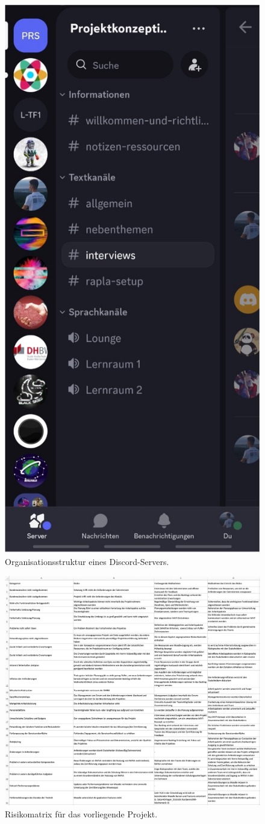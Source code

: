 \begin{figure}[H]
  \centering
  \includegraphics[width=0.47\linewidth]{graphics/discord.jpg}
  \caption{Organisationsstruktur eines Discord-Servers.}\label{abb:discord}
\end{figure}
\label{anhang:kap3}
\begin{figure}[H]
  \centering
  \includegraphics[width=1\linewidth]{graphics/risikomatrix.png}
  \caption{Risikomatrix für das vorliegende Projekt.}\label{abb:risikomatrix}
\end{figure}


